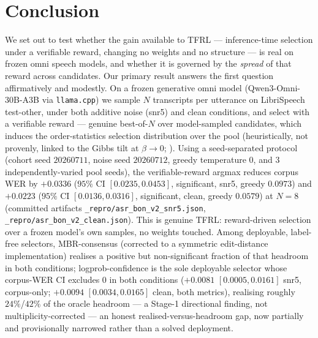 \section{Conclusion}
\label{sec:conclusion}

We set out to test whether the gain available to TFRL --- inference-time selection under a
verifiable reward, changing no weights and no structure --- is real on frozen omni speech models, and
whether it is governed by the \emph{spread} of that reward across candidates. Our primary result
answers the first question affirmatively and modestly. On a frozen generative omni model
(Qwen3-Omni-30B-A3B via \texttt{llama.cpp}) we sample $N$ transcripts per utterance on LibriSpeech
test-other, under both additive noise (snr5) and clean conditions, and select with a verifiable reward
--- genuine best-of-$N$ over model-sampled candidates, which induces the order-statistics selection
distribution over the pool (heuristically, not provenly, linked to the Gibbs tilt at $\beta\to0$;
). Using a seed-separated protocol (cohort seed $20260711$, noise seed
$20260712$, greedy temperature $0$, and $3$ independently-varied pool seeds), the verifiable-reward
argmax reduces corpus WER by $+0.0336$ ($95\%$ CI $[0.0235,0.0453]$, significant, snr5, greedy
$0.0973$) and $+0.0223$ ($95\%$ CI $[0.0136,0.0316]$, significant, clean, greedy $0.0579$) at $N{=}8$
(committed artifacts \texttt{\_repro/asr\_bon\_v2\_snr5.json}, \texttt{\_repro/asr\_bon\_v2\_clean.json}).
This is genuine TFRL: reward-driven selection over a frozen model's own samples, no weights touched.
Among deployable, label-free selectors, MBR-consensus (corrected to a symmetric edit-distance
implementation) realises a positive but non-significant fraction of that headroom in both conditions;
logprob-confidence is the sole deployable selector whose corpus-WER CI excludes $0$ in both conditions
($+0.0081$ $[0.0005,0.0161]$ snr5, corpus-only; $+0.0094$ $[0.0034,0.0165]$ clean, both metrics),
realising roughly $24\%$/$42\%$ of the oracle headroom --- a Stage-1 directional finding, not
multiplicity-corrected --- an honest realised-versus-headroom gap, now partially and provisionally
narrowed rather than a solved deployment.

